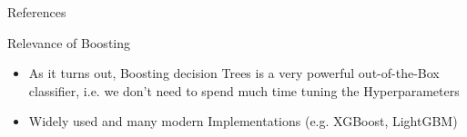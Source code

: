 \documentclass{beamer}
\begin{document}
\begin{frame}{References}
    \printbibliography
\end{frame}

\begin{frame}{Relevance of Boosting}
    \begin{itemize}
        \item As it turns out, Boosting decision Trees is a very powerful out-of-the-Box classifier, i.e. we don't need to spend much time tuning the Hyperparameters
        \item Widely used and many modern Implementations (e.g. XGBoost, LightGBM)
    \end{itemize}
\end{frame}

\end{document}
